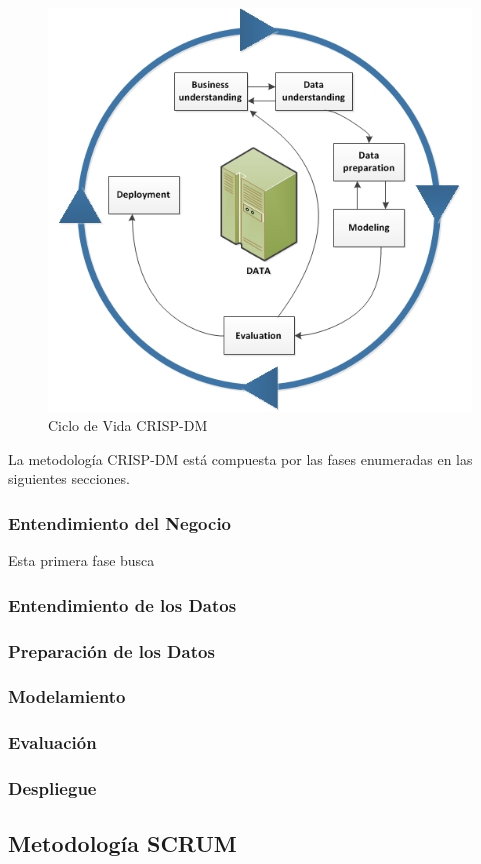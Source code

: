 \begin{figure}[h]
\includegraphics[scale=0.7]{Documento Trabajo de Grado/figures/CicloDeVidaCRISPDM.png}
\centering
\caption{Ciclo de Vida CRISP-DM}
\centering
\end{figure}

La metodología CRISP-DM está compuesta por las fases enumeradas en las siguientes secciones.

\subsubsection{Entendimiento del Negocio}
Esta primera fase busca 
\subsubsection{Entendimiento de los Datos}
\subsubsection{Preparación de los Datos}
\subsubsection{Modelamiento}
\subsubsection{Evaluación}
\subsubsection{Despliegue}


\subsection{Metodología SCRUM}